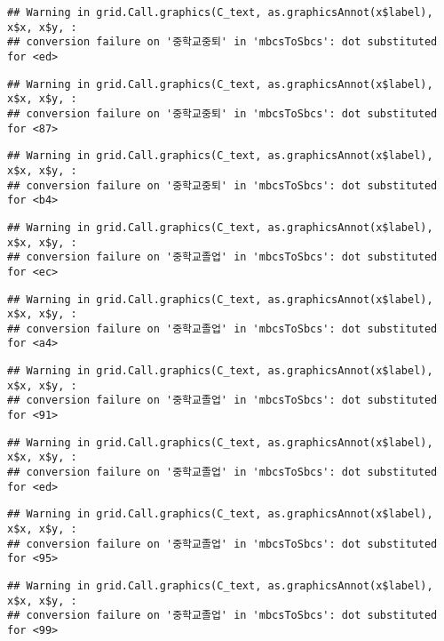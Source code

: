 \documentclass[
]{article}
\begin{document}
\begin{verbatim}
## Warning in grid.Call.graphics(C_text, as.graphicsAnnot(x$label), x$x, x$y, :
## conversion failure on '중학교중퇴' in 'mbcsToSbcs': dot substituted for <ed>
\end{verbatim}

\begin{verbatim}
## Warning in grid.Call.graphics(C_text, as.graphicsAnnot(x$label), x$x, x$y, :
## conversion failure on '중학교중퇴' in 'mbcsToSbcs': dot substituted for <87>
\end{verbatim}

\begin{verbatim}
## Warning in grid.Call.graphics(C_text, as.graphicsAnnot(x$label), x$x, x$y, :
## conversion failure on '중학교중퇴' in 'mbcsToSbcs': dot substituted for <b4>
\end{verbatim}

\begin{verbatim}
## Warning in grid.Call.graphics(C_text, as.graphicsAnnot(x$label), x$x, x$y, :
## conversion failure on '중학교졸업' in 'mbcsToSbcs': dot substituted for <ec>
\end{verbatim}

\begin{verbatim}
## Warning in grid.Call.graphics(C_text, as.graphicsAnnot(x$label), x$x, x$y, :
## conversion failure on '중학교졸업' in 'mbcsToSbcs': dot substituted for <a4>
\end{verbatim}

\begin{verbatim}
## Warning in grid.Call.graphics(C_text, as.graphicsAnnot(x$label), x$x, x$y, :
## conversion failure on '중학교졸업' in 'mbcsToSbcs': dot substituted for <91>
\end{verbatim}

\begin{verbatim}
## Warning in grid.Call.graphics(C_text, as.graphicsAnnot(x$label), x$x, x$y, :
## conversion failure on '중학교졸업' in 'mbcsToSbcs': dot substituted for <ed>
\end{verbatim}

\begin{verbatim}
## Warning in grid.Call.graphics(C_text, as.graphicsAnnot(x$label), x$x, x$y, :
## conversion failure on '중학교졸업' in 'mbcsToSbcs': dot substituted for <95>
\end{verbatim}

\begin{verbatim}
## Warning in grid.Call.graphics(C_text, as.graphicsAnnot(x$label), x$x, x$y, :
## conversion failure on '중학교졸업' in 'mbcsToSbcs': dot substituted for <99>
\end{verbatim}
\end{document}
